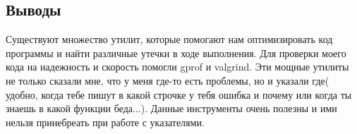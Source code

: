 \documentclass[12pt]{article}
\begin{document}
\subsection*{Выводы}

Существуют множество утилит, которые помогают нам оптимизировать код программы и найти различные 
утечки в ходе выполнения. Для проверки моего кода на надежность и скорость помогли gprof и valgrind. 
Эти мощные утилиты не только сказали мне, что у меня где-то есть проблемы, но и указали где(
удобно, когда тебе пишут в какой  строчке у тебя ошибка и почему или когда ты знаешь в какой функции беда...). 
Данные инструменты очень полезны и ими нельзя принебреать при работе  с  указателями.
\end{document}
